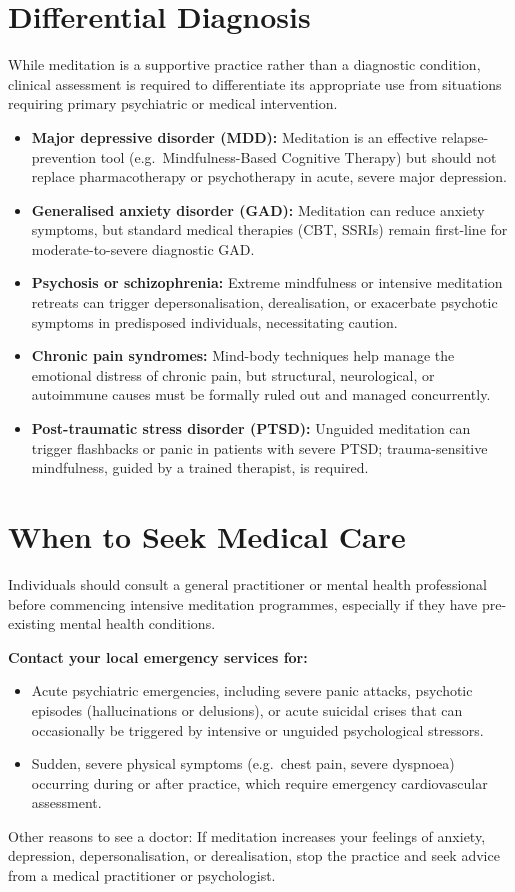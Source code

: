 \section*{Differential Diagnosis}
While meditation is a supportive practice rather than a diagnostic condition, clinical assessment is required to differentiate its appropriate use from situations requiring primary psychiatric or medical intervention.
\begin{itemize}
    \item \textbf{Major depressive disorder (MDD):} Meditation is an effective relapse-prevention tool (e.g.\ Mindfulness-Based Cognitive Therapy) but should not replace pharmacotherapy or psychotherapy in acute, severe major depression.
    \item \textbf{Generalised anxiety disorder (GAD):} Meditation can reduce anxiety symptoms, but standard medical therapies (CBT, SSRIs) remain first-line for moderate-to-severe diagnostic GAD.
    \item \textbf{Psychosis or schizophrenia:} Extreme mindfulness or intensive meditation retreats can trigger depersonalisation, derealisation, or exacerbate psychotic symptoms in predisposed individuals, necessitating caution.
    \item \textbf{Chronic pain syndromes:} Mind-body techniques help manage the emotional distress of chronic pain, but structural, neurological, or autoimmune causes must be formally ruled out and managed concurrently.
    \item \textbf{Post-traumatic stress disorder (PTSD):} Unguided meditation can trigger flashbacks or panic in patients with severe PTSD; trauma-sensitive mindfulness, guided by a trained therapist, is required.
\end{itemize}

\section*{When to Seek Medical Care}
Individuals should consult a general practitioner or mental health professional before commencing intensive meditation programmes, especially if they have pre-existing mental health conditions.

\textbf{Contact your local emergency services for:}
\begin{itemize}
    \item Acute psychiatric emergencies, including severe panic attacks, psychotic episodes (hallucinations or delusions), or acute suicidal crises that can occasionally be triggered by intensive or unguided psychological stressors.
    \item Sudden, severe physical symptoms (e.g.\ chest pain, severe dyspnoea) occurring during or after practice, which require emergency cardiovascular assessment.
\end{itemize}
Other reasons to see a doctor: If meditation increases your feelings of anxiety, depression, depersonalisation, or derealisation, stop the practice and seek advice from a medical practitioner or psychologist.

